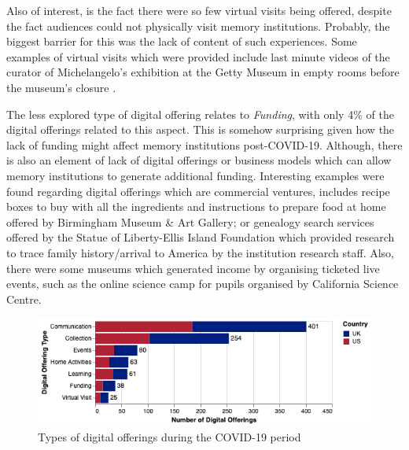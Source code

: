 \documentclass{egpubl}
\begin{document}
Also of interest, is the fact there  were so few virtual visits being offered, despite the fact audiences could not physically visit memory institutions. Probably, the biggest barrier for this was the lack of content of such experiences. Some examples of virtual visits which were provided include last minute videos of the curator of Michelangelo's exhibition at the Getty Museum in empty rooms before the museum's closure \cite{getty2020}.

The less explored type of digital offering relates to \emph{Funding}, with only 4\% of the digital offerings related to this aspect. This is somehow surprising given how the lack of funding might affect memory institutions post-COVID-19. Although, there is also an element of lack of digital offerings or business models which can allow memory institutions to generate additional funding. Interesting examples were found regarding digital offerings which are commercial ventures, includes recipe boxes to buy with all the ingredients and instructions to prepare food at home offered by Birmingham Museum \& Art Gallery; or genealogy search services offered by the Statue of Liberty-Ellis Island Foundation which provided research to trace family history/arrival to America by the institution research staff. Also, there were some museums which generated income by organising ticketed live events, such as the online science camp for pupils organised by California Science Centre.





\begin{figure}[h]
  \centering
  \includegraphics[width=\linewidth]{images/digitalTypes.png}
  \caption{\label{fig:DigOffType}
           Types of digital offerings during the COVID-19 period}
\end{figure}
\end{document}
